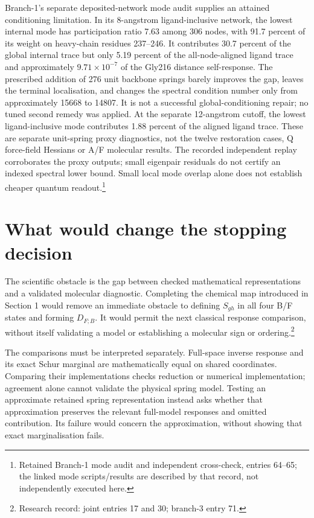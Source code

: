 \documentclass{article}
\begin{document}
Branch-1's separate deposited-network mode audit supplies an attained conditioning limitation. In its 8-angstrom ligand-inclusive network, the lowest internal mode has participation ratio 7.63 among 306 nodes, with 91.7 percent of its weight on heavy-chain residues 237--246. It contributes 30.7 percent of the global internal trace but only 5.19 percent of the all-node-aligned ligand trace and approximately \(9.71\times10^{-7}\) of the Gly216 distance self-response. The prescribed addition of 276 unit backbone springs barely improves the gap, leaves the terminal localisation, and changes the spectral condition number only from approximately 15668 to 14807. It is not a successful global-conditioning repair; no tuned second remedy was applied. At the separate 12-angstrom cutoff, the lowest ligand-inclusive mode contributes 1.88 percent of the aligned ligand trace. These are separate unit-spring proxy diagnostics, not the twelve restoration cases, Q force-field Hessians or A/F molecular results. The recorded independent replay corroborates the proxy outputs; small eigenpair residuals do not certify an indexed spectral lower bound. Small local mode overlap alone does not establish cheaper quantum readout.\footnote{Retained Branch-1 mode audit and independent cross-check, entries 64--65; the linked mode scripts/results are described by that record, not independently executed here.}

\section{What would change the stopping decision}
The scientific obstacle is the gap between checked mathematical representations and a validated molecular diagnostic. Completing the chemical map introduced in Section 1 would remove an immediate obstacle to defining \(S_{gh}\) in all four B/F states and forming \(D_{F;B}\). It would permit the next classical response comparison, without itself validating a model or establishing a molecular sign or ordering.\footnote{Research record: joint entries 17 and 30; branch-3 entry 71.}

The comparisons must be interpreted separately. Full-space inverse response and its exact Schur marginal are mathematically equal on shared coordinates. Comparing their implementations checks reduction or numerical implementation; agreement alone cannot validate the physical spring model. Testing an approximate retained spring representation instead asks whether that approximation preserves the relevant full-model responses and omitted contribution. Its failure would concern the approximation, without showing that exact marginalisation fails.
\end{document}
